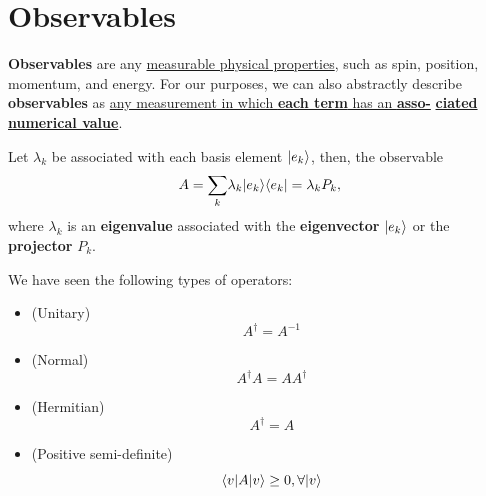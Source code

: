 \documentclass[12pt]{article}
\begin{document}
\section{Observables}
\begin{definition}[Observables]
\textbf{Observables} are any \underline{measurable physical properties}, such as spin, position, momentum, and energy. For our purposes, we can also abstractly describe \textbf{observables} as \underline{any measurement in which \textbf{each term} has an \textbf{asso-}} \underline{\textbf{ciated numerical value}}.
\end{definition}

\noindent Let $\lambda_k$ be associated with each basis element $\Ket{e_k}$, then, the observable $$
A = \underset{k}{\sum}\lambda_k \kb{e_k}{e_k} = \lambda_k P_k,
$$ where $\lambda_k$ is an \textbf{eigenvalue} associated with the \textbf{eigenvector} $\Ket{e_k}$ or the \textbf{projector} $P_k$.

\begin{definition}[Recall]
We have seen the following types of operators:
\begin{itemize}
    \item (Unitary) $$
    A^\dag = A^{-1}
    $$
    \item (Normal) $$
    A^\dag A = AA^\dag
    $$
    \item (Hermitian) $$
    A^\dag = A
    $$
    \item (Positive semi-definite) $$
    \Bra{v}A \Ket{v} \geq 0, \forall \Ket{v}
    $$
\end{itemize}
\end{definition}
\end{document}
